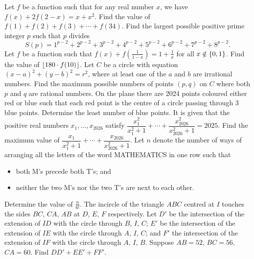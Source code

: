 \begin{enumerate}
    \hyperrefitem[A::2024-O-1-18] Let $f$ be a function such that for any real number $x$, we have $f(x) + 2f(2-x) = x + x^2$. Find the value of $f(1) + f(2) + f(3) + \cdots + f(34)$.
    \hyperrefitem[A::2024-O-1-19] Find the largest possible positive prime integer $p$ such that $p$ divides \[S(p) = 1^{p-2} + 2^{p-2} + 3^{p-2} + 4^{p-2} + 5^{p-2} + 6^{p-2} + 7^{p-2} + 8^{p-2}.\]
    \hyperrefitem[A::2024-O-1-20] Let $f$ be a function such that $f(x) + f(\frac{1}{1-x}) = 1 + \frac1x$ for all $x \notin \left\lbrace 0, 1 \right\rbrace$. Find the value of $\left\lfloor 180 \cdot f(10) \right\rfloor$.
    \hyperrefitem[A::2024-O-1-21] Let $C$ be a circle with equation $(x-a)^2 + (y-b)^2 = r^2$, where at least one of the $a$ and $b$ are irrational numbers. Find the maximum possible numbers of points $(p,q)$ on $C$ where both $p$ and $q$ are rational numbers.
    \hyperrefitem[A::2024-O-1-22] On the plane there are 2024 points coloured either red or blue such that each red point is the centre of a circle passing through 3 blue points. Determine the least number of blue points.
    \hyperrefitem[A::2024-O-1-23] It is given that the positive real numbers $x_1, \ldots, x_{2026}$ satisfy $\dfrac{x_1^2}{x_1^2 + 1} + \cdots + \dfrac{x_{2026}^2}{x_{2026}^2 + 1} = 2025$. Find the maximum value of $\dfrac{x_1}{x_1^2 + 1} + \cdots + \dfrac{x_{2026}}{x_{2026}^2 + 1}$.
    \hyperrefitem[A::2024-O-1-24] Let $n$ denote the number of ways of arranging all the letters of the word MATHEMATICS in one row such that
    \begin{itemize}
        \item both M's precede both T's; and
        \item neither the two M's nor the two T's are next to each other.
    \end{itemize}
    Determine the value of $\frac{n}{6!}$.
    \hyperrefitem[A::2024-O-1-25] The incircle of the triangle $ABC$ centred at $I$ touches the sides $BC$, $CA$, $AB$ at $D$, $E$, $F$ respectively. Let $D'$ be the intersection of the extension of $ID$ with the circle through $B$, $I$, $C$; $E'$ be the intersection of the extension of $IE$ with the circle through $A$, $I$, $C$; and $F'$ the intersection of the extension of $IF$ with the circle through $A$, $I$, $B$. Suppose $AB = 52$, $BC = 56$, $CA = 60$. Find $DD' + EE' + FF'$.
 \end{enumerate}
